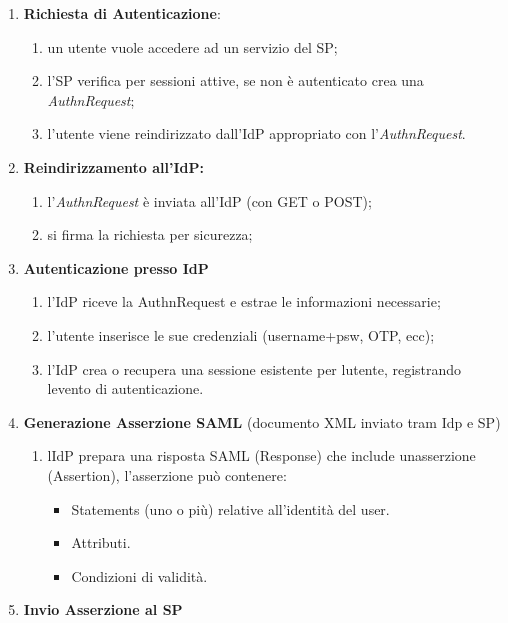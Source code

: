 \begin{enumerate}
\def\labelenumi{\arabic{enumi}.}
\item
  \textbf{Richiesta di Autenticazione}:

  \begin{enumerate}
  \def\labelenumii{\alph{enumii}.}
  \item
    un utente vuole accedere ad un servizio del SP;
  \item
    l'SP verifica per sessioni attive, se non è autenticato crea una
    \emph{AuthnRequest};
  \item
    l'utente viene reindirizzato dall'IdP appropriato con
    l'\emph{AuthnRequest}.
  \end{enumerate}
\item
  \textbf{Reindirizzamento all'IdP:}

  \begin{enumerate}
  \def\labelenumii{\alph{enumii}.}
  \item
    l'\emph{AuthnRequest} è inviata all'IdP (con GET o POST);
  \item
    si firma la richiesta per sicurezza;
  \end{enumerate}
\item
  \textbf{Autenticazione presso IdP}

  \begin{enumerate}
  \def\labelenumii{\alph{enumii}.}
  \item
    l'IdP riceve la AuthnRequest e estrae le informazioni necessarie;
  \item
    l'utente inserisce le sue credenziali (username+psw, OTP, ecc);
  \item
    l'\textquotesingle IdP crea o recupera una sessione esistente per
    l\textquotesingle utente, registrando l\textquotesingle evento di
    autenticazione.
  \end{enumerate}
\item
  \textbf{Generazione Asserzione SAML} (documento XML inviato tram Idp e
  SP)

  \begin{enumerate}
  \def\labelenumii{\alph{enumii}.}
  \item
    l\textquotesingle IdP prepara una risposta SAML (Response) che
    include un\textquotesingle asserzione (Assertion), l'asserzione può
    contenere:

    \begin{itemize}
    \item
      Statements (uno o più) relative all'identità del user.
    \item
      Attributi.
    \item
      Condizioni di validità.
    \end{itemize}
  \end{enumerate}
\item
  \textbf{Invio Asserzione al SP}


\end{enumerate}
